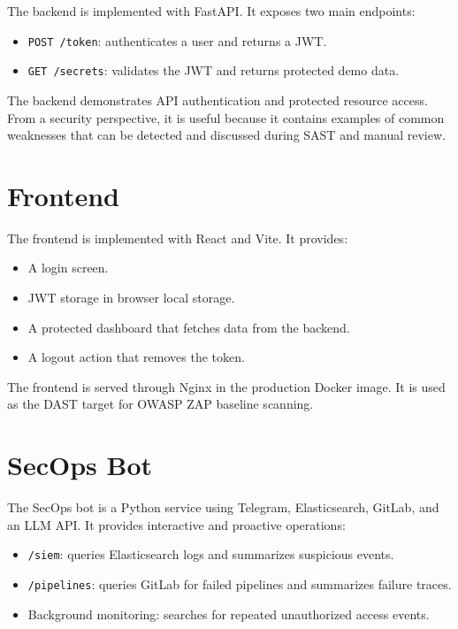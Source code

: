 \documentclass[12pt,a4paper]{report}
\begin{document}
The backend is implemented with FastAPI. It exposes two main endpoints:

\begin{itemize}[leftmargin=*]
    \item \texttt{POST /token}: authenticates a user and returns a JWT.
    \item \texttt{GET /secrets}: validates the JWT and returns protected demo data.
\end{itemize}

The backend demonstrates API authentication and protected resource access. From a security perspective, it is useful because it contains examples of common weaknesses that can be detected and discussed during SAST and manual review.

\section{Frontend}

The frontend is implemented with React and Vite. It provides:

\begin{itemize}[leftmargin=*]
    \item A login screen.
    \item JWT storage in browser local storage.
    \item A protected dashboard that fetches data from the backend.
    \item A logout action that removes the token.
\end{itemize}

The frontend is served through Nginx in the production Docker image. It is used as the DAST target for OWASP ZAP baseline scanning.

\section{SecOps Bot}

The SecOps bot is a Python service using Telegram, Elasticsearch, GitLab, and an LLM API. It provides interactive and proactive operations:

\begin{itemize}[leftmargin=*]
    \item \texttt{/siem}: queries Elasticsearch logs and summarizes suspicious events.
    \item \texttt{/pipelines}: queries GitLab for failed pipelines and summarizes failure traces.
    \item Background monitoring: searches for repeated unauthorized access events.
\end{itemize}
\end{document}
